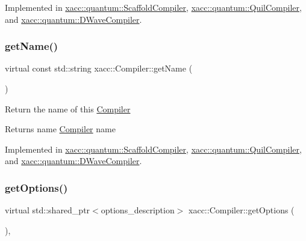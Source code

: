 Implemented in \hyperlink{a00935_a3736ecc229fe6acdd4c991e85d7a1f08}{xacc\+::quantum\+::\+Scaffold\+Compiler}, \hyperlink{a00911_adf4d321ecb0df3fa7728999f941c83b2}{xacc\+::quantum\+::\+Quil\+Compiler}, and \hyperlink{a00947_a893e1d1c81a8aaf6e2435c9bceab575e}{xacc\+::quantum\+::\+D\+Wave\+Compiler}.

\mbox{\label{a01103_a87fca9100e6462122f5b687c3a0fb3fb}} 
\subsubsection{\texorpdfstring{get\+Name()}{getName()}}
{\footnotesize\ttfamily virtual const std\+::string xacc\+::\+Compiler\+::get\+Name (\begin{DoxyParamCaption}{ }\end{DoxyParamCaption})\hspace{0.3cm}{\ttfamily [pure virtual]}}

Return the name of this \hyperlink{a01103}{Compiler} \begin{DoxyReturn}{Returns}
name \hyperlink{a01103}{Compiler} name 
\end{DoxyReturn}


Implemented in \hyperlink{a00935_a3f537054a3924a1d14f4ceb0f0181161}{xacc\+::quantum\+::\+Scaffold\+Compiler}, \hyperlink{a00911_ae7d52140b6dd52730edc6e38ae48f437}{xacc\+::quantum\+::\+Quil\+Compiler}, and \hyperlink{a00947_a8a180031ae563e1a9aac611e8066c181}{xacc\+::quantum\+::\+D\+Wave\+Compiler}.

\mbox{\label{a01103_a9f5a8965c9c2dd895016d18264ebbe92}} 
\subsubsection{\texorpdfstring{get\+Options()}{getOptions()}}
{\footnotesize\ttfamily virtual std\+::shared\+\_\+ptr$<$options\+\_\+description$>$ xacc\+::\+Compiler\+::get\+Options (\begin{DoxyParamCaption}{ }\end{DoxyParamCaption})\hspace{0.3cm}{\ttfamily [inline]}, {\ttfamily [virtual]}}

